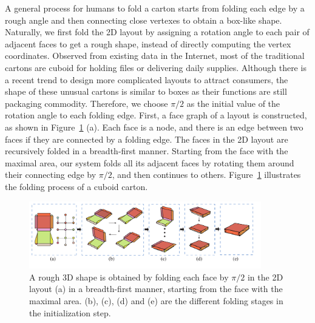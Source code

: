 


A general process for humans to fold a carton starts from folding each edge by a rough angle and then connecting close vertexes to obtain a box-like shape. 
Naturally, we first fold the 2D layout by assigning a rotation angle to each pair of adjacent faces to get a rough shape, instead of directly computing the vertex coordinates.
%	
Observed from existing data in the Internet, most of the traditional cartons are cuboid for holding files or delivering daily supplies. 
Although there is a recent trend to design more complicated layouts to attract consumers, the shape of these unusual cartons is similar to boxes as their functions are still packaging commodity. 
%
Therefore, we choose $\pi/2$ as the initial value of the rotation angle to each folding edge. 
%
First, a face graph of a layout is constructed, as shown in Figure~\ref{fig:midresult} (a).
Each face is a node, and there is an edge between two faces if they are connected by a folding edge.
%
The faces in the 2D layout are recursively folded in a breadth-first manner.
Starting from the face with the maximal area, our system folds all its adjacent faces by rotating them around their connecting edge by $\pi/2$, and then continues to others. 
Figure~\ref{fig:midresult} illustrates the folding process of a cuboid carton. 

\begin{figure}
	\centering
	\includegraphics[width=0.9\textwidth]{images/midresult}
	\caption{A rough 3D shape is obtained by folding each face by $\pi/2$ in the 2D layout (a) in a breadth-first manner, starting from the face with the maximal area. (b), (c), (d) and (e) are the different folding stages in the initialization step.}
	\label{fig:midresult}
\end{figure}


